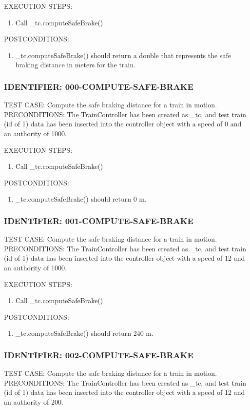 \documentclass{scrreprt}
\begin{document}
EXECUTION STEPS:
\begin{enumerate}
	\item Call _tc.computeSafeBrake()
\end{enumerate}
POSTCONDITIONS:
\begin{enumerate}
	\item _tc.computeSafeBrake() should return a double that represents the safe braking distance in meters for the train.
\end{enumerate}

\subsubsection{IDENTIFIER: 000-COMPUTE-SAFE-BRAKE}
TEST CASE: Compute the safe braking distance for a train in motion.
PRECONDITIONS: The TrainController has been created as _tc, and test train (id of 1) data has been inserted into the controller object with a speed of 0 and an authority of 1000.

EXECUTION STEPS:
\begin{enumerate}
	\item Call _tc.computeSafeBrake()
\end{enumerate}
POSTCONDITIONS:
\begin{enumerate}
	\item _tc.computeSafeBrake() should return 0 m.
\end{enumerate}

\subsubsection{IDENTIFIER: 001-COMPUTE-SAFE-BRAKE}
TEST CASE: Compute the safe braking distance for a train in motion.
PRECONDITIONS: The TrainController has been created as _tc, and test train (id of 1) data has been inserted into the controller object with a speed of 12 and an authority of 1000.

EXECUTION STEPS:
\begin{enumerate}
	\item Call _tc.computeSafeBrake()
\end{enumerate}
POSTCONDITIONS:
\begin{enumerate}
	\item _tc.computeSafeBrake() should return 240 m.
\end{enumerate}

\subsubsection{IDENTIFIER: 002-COMPUTE-SAFE-BRAKE}
TEST CASE: Compute the safe braking distance for a train in motion.
PRECONDITIONS: The TrainController has been created as _tc, and test train (id of 1) data has been inserted into the controller object with a speed of 12 and an authority of 200.
\end{document}
